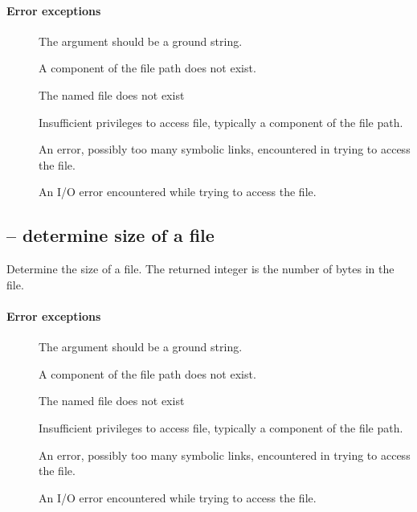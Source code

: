 \paragraph{Error exceptions}
\begin{description}
\item[]
The argument should be a ground string.
\item[]
A component of the file path does not exist.
\item[]
The named file does not exist
\item[]
Insufficient privileges to access file, typically a component of the file path.
\item[]
An error, possibly too many symbolic links, encountered in trying to access the file.
\item[]
An I/O error encountered while trying to access the file.
\end{description}

\subsection{ -- determine size of a file}
\label{io:fsize}
Determine the size of a file. The returned integer is the number of bytes in the file.

\paragraph{Error exceptions}
\begin{description}
\item[]
The argument should be a ground string.
\item[]
A component of the file path does not exist.
\item[]
The named file does not exist
\item[]
Insufficient privileges to access file, typically a component of the file path.
\item[]
An error, possibly too many symbolic links, encountered in trying to access the file.
\item[]
An I/O error encountered while trying to access the file.
\end{description}


